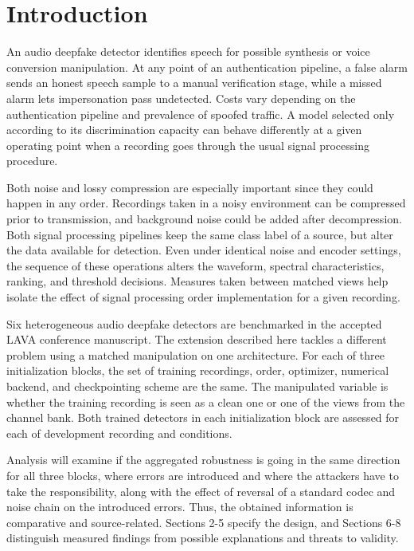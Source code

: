 \section{Introduction}\label{sec:intro}

An audio deepfake detector identifies speech for possible synthesis or voice conversion manipulation. At any point of an authentication pipeline, a false alarm sends an honest speech sample to a manual verification stage, while a missed alarm lets impersonation pass undetected. Costs vary depending on the authentication pipeline and prevalence of spoofed traffic. A model selected only according to its discrimination capacity can behave differently at a given operating point when a recording goes through the usual signal processing procedure.

Both noise and lossy compression are especially important since they could happen in any order. Recordings taken in a noisy environment can be compressed prior to transmission, and background noise could be added after decompression. Both signal processing pipelines keep the same class label of a source, but alter the data available for detection. Even under identical noise and encoder settings, the sequence of these operations alters the waveform, spectral characteristics, ranking, and threshold decisions. Measures taken between matched views help isolate the effect of signal processing order implementation for a given recording.

Six heterogeneous audio deepfake detectors are benchmarked in the accepted LAVA conference manuscript. The extension described here tackles a different problem using a matched manipulation on one architecture. For each of three initialization blocks, the set of training recordings, order, optimizer, numerical backend, and checkpointing scheme are the same. The manipulated variable is whether the training recording is seen as a clean one or one of the views from the channel bank. Both trained detectors in each initialization block are assessed for each of development recording and conditions.

Analysis will examine if the aggregated robustness is going in the same direction for all three blocks, where errors are introduced and where the attackers have to take the responsibility, along with the effect of reversal of a standard codec and noise chain on the introduced errors. Thus, the obtained information is comparative and source-related. Sections 2-5 specify the design, and Sections 6-8 distinguish measured findings from possible explanations and threats to validity.

